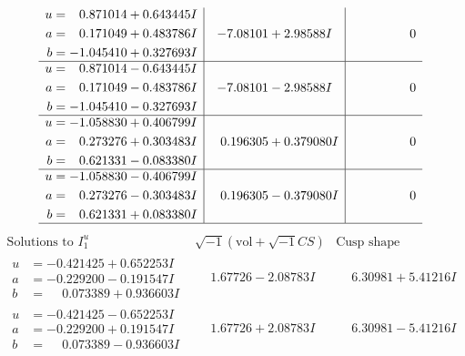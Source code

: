 \documentclass[1p]{elsarticle_modified}
\theoremstyle{definition}
\newcommand{\I}{\sqrt{-1}}
\begin{document}
$$\begin{array}{c|c|c}
\begin{aligned}
u &= \phantom{-}0.871014 + 0.643445 I \\
a &= \phantom{-}0.171049 + 0.483786 I \\
b &= -1.045410 + 0.327693 I\end{aligned}
 & -7.08101 + 2.98588 I & \phantom{-0.000000 } 0 \\ \hline\begin{aligned}
u &= \phantom{-}0.871014 - 0.643445 I \\
a &= \phantom{-}0.171049 - 0.483786 I \\
b &= -1.045410 - 0.327693 I\end{aligned}
 & -7.08101 - 2.98588 I & \phantom{-0.000000 } 0 \\ \hline\begin{aligned}
u &= -1.058830 + 0.406799 I \\
a &= \phantom{-}0.273276 + 0.303483 I \\
b &= \phantom{-}0.621331 - 0.083380 I\end{aligned}
 & \phantom{-}0.196305 + 0.379080 I & \phantom{-0.000000 } 0 \\ \hline\begin{aligned}
u &= -1.058830 - 0.406799 I \\
a &= \phantom{-}0.273276 - 0.303483 I \\
b &= \phantom{-}0.621331 + 0.083380 I\end{aligned}
 & \phantom{-}0.196305 - 0.379080 I & \phantom{-0.000000 } 0\\
 \hline 
 \end{array}$$\newpage$$\begin{array}{c|c|c}  
\text{Solutions to }I^u_{1}& \I (\text{vol} + \sqrt{-1}CS) & \text{Cusp shape}\\
 \hline 
\begin{aligned}
u &= -0.421425 + 0.652253 I \\
a &= -0.229200 - 0.191547 I \\
b &= \phantom{-}0.073389 + 0.936603 I\end{aligned}
 & \phantom{-}1.67726 - 2.08783 I & \phantom{-}6.30981 + 5.41216 I \\ \hline\begin{aligned}
u &= -0.421425 - 0.652253 I \\
a &= -0.229200 + 0.191547 I \\
b &= \phantom{-}0.073389 - 0.936603 I\end{aligned}
 & \phantom{-}1.67726 + 2.08783 I & \phantom{-}6.30981 - 5.41216 I \\ \hline\begin{aligned}

\end{aligned}
\end{array}$$
\end{document}
